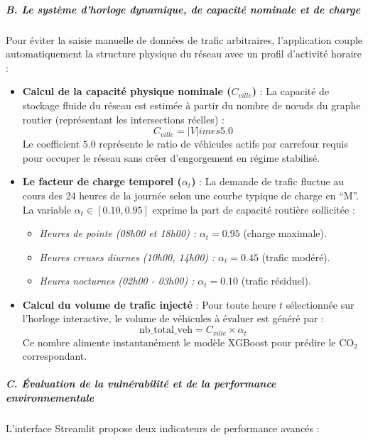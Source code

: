 \documentclass[10pt, a4paper]{article}
\providecommand{\tightlist}{}
\begin{document}
\subparagraph{B. Le système d'horloge dynamique, de capacité nominale et
de
charge}\label{b.-le-systuxe8me-dhorloge-dynamique-de-capacituxe9-nominale-et-de-charge}

Pour éviter la saisie manuelle de données de trafic arbitraires,
l'application couple automatiquement la structure physique du réseau
avec un profil d'activité horaire :

\begin{itemize}
\item
  \textbf{Calcul de la capacité physique nominale (\(C_{ville}\))} : La
  capacité de stockage fluide du réseau est estimée à partir du nombre
  de nœuds du graphe routier (représentant les intersections réelles) :
  \[C_{ville} = |V|   imes 5.0\] Le coefficient \(5.0\) représente le
  ratio de véhicules actifs par carrefour requis pour occuper le réseau
  sans créer d'engorgement en régime stabilisé.
\item
  \textbf{Le facteur de charge temporel (\(\alpha_t\))} : La demande de
  trafic fluctue au cours des 24 heures de la journée selon une courbe
  typique de charge en ``M''. La variable \(\alpha_t \in [0.10, 0.95]\)
  exprime la part de capacité routière sollicitée :

  \begin{itemize}
  \tightlist
  \item
    \emph{Heures de pointe (08h00 et 18h00) :} \(\alpha_t = 0.95\)
    (charge maximale).
  \item
    \emph{Heures creuses diurnes (10h00, 14h00) :} \(\alpha_t = 0.45\)
    (trafic modéré).
  \item
    \emph{Heures nocturnes (02h00 - 03h00) :} \(\alpha_t = 0.10\)
    (trafic résiduel).
  \end{itemize}
\item
  \textbf{Calcul du volume de trafic injecté} : Pour toute heure \(t\)
  sélectionnée sur l'horloge interactive, le volume de véhicules à
  évaluer est généré par :
  \[\text{nb\_total\_veh} = C_{ville} \times \alpha_t\] Ce nombre
  alimente instantanément le modèle XGBoost pour prédire le CO₂
  correspondant.
\end{itemize}

\subparagraph{C. Évaluation de la vulnérabilité et de la performance
environnementale}\label{c.-uxe9valuation-de-la-vulnuxe9rabilituxe9-et-de-la-performance-environnementale}

L'interface Streamlit propose deux indicateurs de performance avancés :
\end{document}
